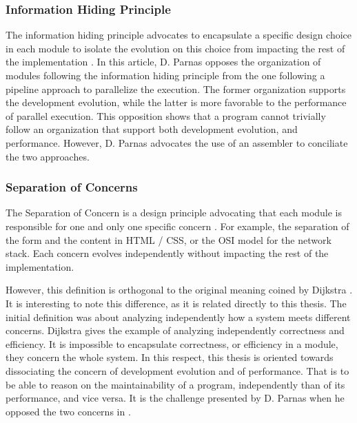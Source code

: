 \subsubsection{Information Hiding Principle}

The information hiding principle advocates to encapsulate a specific design choice in each module to isolate the evolution on this choice from impacting the rest of the implementation \cite{Parnas1972}.
In this article, D. Parnas opposes the organization of modules following the information hiding principle from the one following a pipeline approach to parallelize the execution.
The former organization supports the development evolution, while the latter is more favorable to the performance of parallel execution.
This opposition shows that a program cannot trivially follow an organization that support both development evolution, and performance.
However, D. Parnas advocates the use of an assembler to conciliate the two approaches.


\subsubsection{Separation of Concerns}

The Separation of Concern is a design principle advocating that each module is responsible for one and only one specific concern \cite{Tarr1999,Hursch1995}.
For example, the separation of the form and the content in HTML / CSS, or the OSI model for the network stack.
Each concern evolves independently without impacting the rest of the implementation.

However, this definition is orthogonal to the original meaning coined by Dijkstra \cite{Dijkstra1982}.
It is interesting to note this difference, as it is related directly to this thesis.
The initial definition was about analyzing independently how a system meets different concerns.
Dijkstra gives the example of analyzing independently correctness and efficiency.
It is impossible to encapsulate correctness, or efficiency in a module, they concern the whole system.
In this respect, this thesis is oriented towards dissociating the concern of development evolution and of performance.
That is to be able to reason on the maintainability of a program, independently than of its performance, and vice versa.
It is the challenge presented by D. Parnas when he opposed the two concerns in \cite{Parnas1972}.

